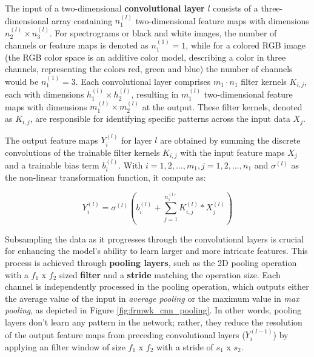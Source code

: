 The input of a two-dimensional \textbf{convolutional layer} $l$ consists of a three-dimensional array containing $n_1^{(l)}$ two-dimensional feature maps with dimensions $n_2^{(l)} \times n_3^{(l)}$. For spectrograms or black and white images, the number of channels or feature maps is denoted as $n_1^{(1)}=1$, while for a colored RGB image (the RGB color space is an additive color model, describing a color in three channels, representing the colors red, green and blue) the number of channels would be $n_1^{(1)}=3$. Each convolutional layer comprises $m_1 \cdot n_1$ filter kernels $K_{i,j}$, each with dimensions $h_1^{(l)} \times h_2^{(l)}$, resulting in $m_1^{(l)}$ two-dimensional feature maps with dimensions $m_1^{(l)} \times m_2^{(l)}$ at the output. These filter kernels, denoted as $K_{i,j}$, are responsible for identifying specific patterns across the input data $X_j$. 

The output feature maps $Y_i^{(l)}$ for layer $l$ are obtained by summing the discrete convolutions of the trainable filter kernels $K_{i,j}$ with the input feature maps $X_j$ and a trainable bias term $b_i^{(l)}$. With $i = 1, 2,\ldots, m_1, j = 1, 2,\ldots, n_1$ and $\sigma^{(l)}$ as the non-linear transformation function, it compute as:

\begin{equation}
    \label{eq:cnn_convolutional_layer}
    Y_i^{(l)}=\sigma^{(l)}\left(b_i^{(l)}+\sum_{j=1}^{n_1^{(l)}} K_{i, j}^{(l)} * X_j^{(l)}\right)
\end{equation}


Subsampling the data as it progresses through the convolutional layers is crucial for enhancing the model's ability to learn larger and more intricate features. This process is achieved through \textbf{pooling layers}, such as the 2D pooling operation with a $f_1$ x $f_2$ sized \textbf{filter} and a \textbf{stride} matching the operation size. Each channel is independently processed in the pooling operation, which outputs either the average value of the input in \textit{average pooling} or the maximum value in \textit{max pooling}, as depicted in Figure \ref{fig:frmwk_cnn_pooling}. In other words, pooling layers don't learn any pattern in the network; rather, they reduce the resolution of the output feature maps from preceding convolutional layers ($Y_i^{(l-1)}$) by applying an filter window of size $f_1$ x $f_2$ with a stride of $s_1$ x $s_2$.

